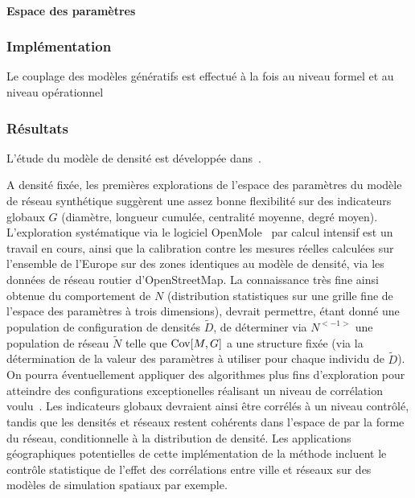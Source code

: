 \paragraph{Espace des paramètres}






\subsubsection{Implémentation}

Le couplage des modèles génératifs est effectué à la fois au niveau formel et au niveau opérationnel 



\subsubsection{Résultats}

L'étude du modèle de densité est développée dans~\cite{}.%



\begin{figure}


\end{figure}


A densité fixée, les premières explorations de l'espace des paramètres du modèle de réseau synthétique suggèrent une assez bonne flexibilité sur des indicateurs globaux $G$ (diamètre, longueur cumulée, centralité moyenne, degré moyen). L'exploration systématique via le logiciel OpenMole~\cite{reuillon2013openmole} par calcul intensif est un travail en cours, ainsi que la calibration contre les mesures réelles calculées sur l'ensemble de l'Europe sur des zones identiques au modèle de densité, via les données de réseau routier d'OpenStreetMap. La connaissance très fine ainsi obtenue du comportement de $N$ (distribution statistiques sur une grille fine de l'espace des paramètres à trois dimensions), devrait permettre, étant donné une population de configuration de densités $\tilde{D}$, de déterminer via $N^{<-1>}$ une population de réseau $\tilde{N}$ telle que $\operatorname{Cov}\!\left[M,G\right]$ a une structure fixée (via la détermination de la valeur des paramètres à utiliser pour chaque individu de $\tilde{D}$). On pourra éventuellement appliquer des algorithmes plus fins d'exploration pour atteindre des configurations exceptionelles réalisant un niveau de corrélation voulu~\cite{10.1371/journal.pone.0138212}. Les indicateurs globaux devraient ainsi être corrélés à un niveau contrôlé, tandis que les densités et réseaux restent cohérents dans l'espace de par la forme du réseau, conditionnelle à la distribution de densité. Les applications géographiques potentielles de cette implémentation de la méthode incluent le contrôle statistique de l'effet des corrélations entre ville et réseaux sur des modèles de simulation spatiaux par exemple.



